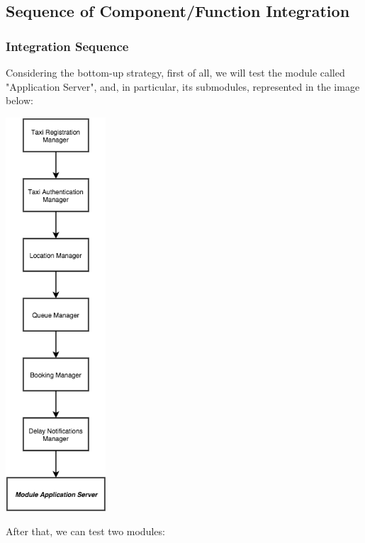 \subsection{Sequence of Component/Function Integration}
\subsubsection{Integration Sequence}
Considering the bottom-up strategy, first of all, we will test the module called "Application Server", and, in particular, its submodules, represented in the image below:
    \begin{center}
	    \includegraphics[width=0.28\textwidth]{./images/ModuleApplicationServer.png}~\\[1.5cm] 
    \end{center}	
After that, we can test two modules:
